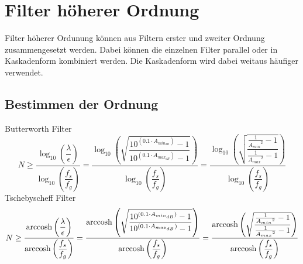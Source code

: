 



\section{Filter höherer Ordnung}
Filter höherer Ordunung können aus Filtern erster und zweiter Ordnung 
zusammengesetzt werden. Dabei können die einzelnen Filter parallel oder in 
Kaskadenform kombiniert werden. Die Kaskadenform wird dabei weitaus häufiger 
verwendet. 

\subsection{Bestimmen der Ordnung}
Butterworth Filter
\[ N \geq \frac{\log_{10}\left(\dfrac{\lambda}{\epsilon}\right)}
{\log_{10}\left(\dfrac{f_s}{f_g}\right)} 
= \frac{\log_{10}\left(\sqrt{\dfrac{10^{(0.1 \cdot A_{min_{dB}})} - 1}
{10^{(0.1 \cdot A_{max_{dB}})} - 1}}\right)}
{\log_{10}\left(\dfrac{f_s}{f_g}\right)} 
= \frac{\log_{10}\left(\sqrt{\dfrac{\frac{1}{{A_{min}}^2} - 1}
{\frac{1}{{A_{max}}^2} - 1}}\right)}
{\log_{10}\left(\dfrac{f_s}{f_g}\right)} \]
Tschebyscheff Filter
\[ N \geq \frac{\operatorname{arccosh}\left(\dfrac{\lambda}{\epsilon}\right)}
{\operatorname{arccosh}\left(\dfrac{f_s}{f_g}\right)} 
= \frac{\operatorname{arccosh}\left(\sqrt{\dfrac{10^{(0.1 \cdot A_{min_{dB}})} - 1}
{10^{(0.1 \cdot A_{max_{dB}})} - 1}}\right)}
{\operatorname{arccosh}\left(\dfrac{f_s}{f_g}\right)} 
= \frac{\operatorname{arccosh}\left(\sqrt{\dfrac{\frac{1}{{A_{min}}^2} - 1}
{\frac{1}{{A_{max}}^2} - 1}}\right)}
{\operatorname{arccosh}\left(\dfrac{f_s}{f_g}\right)} \]

\newpage
